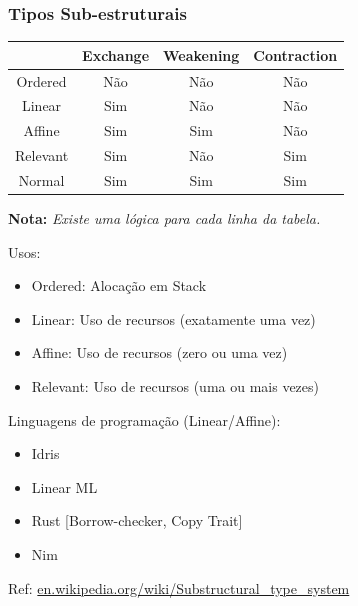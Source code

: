 \documentclass{beamer}
\newcommand{\nota}[1]{\textbf{Nota:}\textit{ #1}}
\begin{document}
\begin{frame}
    \frametitle{Tipos Sub-estruturais}
      {
        \begin{center} \begin{tabular}{|c|c|c|c|}
            \hline
                     & Exchange & Weakening & Contraction \\\hline
            \hline
            Ordered  & Não      & Não       & Não         \\\hline
            Linear   & Sim      & Não       & Não         \\\hline
            Affine   & Sim      & Sim       & Não         \\\hline
            Relevant & Sim      & Não       & Sim         \\\hline
            Normal   & Sim      & Sim       & Sim         \\\hline
        \end{tabular} \end{center}
        \nota{Existe uma lógica para cada linha da tabela.}
        \vfill
         {
            Usos:
            \begin{itemize}
                \item Ordered: Alocação em Stack
                \item Linear: Uso de recursos (exatamente uma vez)
                \item Affine: Uso de recursos (zero ou uma vez)
                \item Relevant: Uso de recursos (uma ou mais vezes)
            \end{itemize}
        }  {
            Linguagens de programação (Linear/Affine):
            \begin{itemize}
                \item Idris
                \item Linear ML
                \item Rust [Borrow-checker, Copy Trait]
                \item Nim
            \end{itemize}
        }
        \vfill
        Ref: \url{en.wikipedia.org/wiki/Substructural_type_system}
    }
\end{frame}
\end{document}
